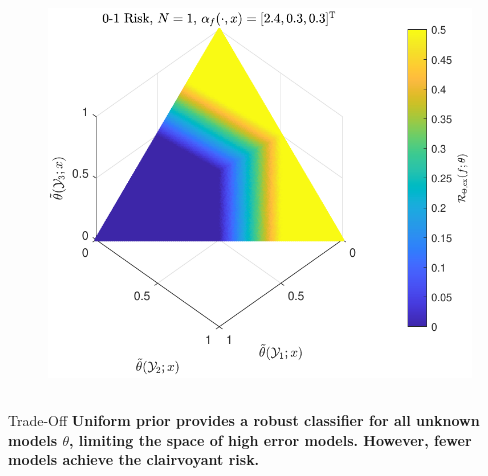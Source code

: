 \documentclass[aspectratio=169]{beamer}
\begin{document}
\begin{frame}
\begin{columns}[c]
\begin{column}{.5\linewidth}
\begin{figure}
\centering
\includegraphics[width=0.8\linewidth]{Risk_cond_ex_01_Dir_theta__subj_clim.pdf}
\label{fig:Risk_cond_ex_01_Dir_theta__subj}
\end{figure}

\end{column}

\end{columns}

\vspace{-0.2em}
\begin{block}{Trade-Off}
\textbf{Uniform prior provides a robust classifier for all unknown models $\theta$, limiting the space of high error models. However, fewer models achieve the clairvoyant risk.}
\end{block}


\end{frame}
\end{document}
